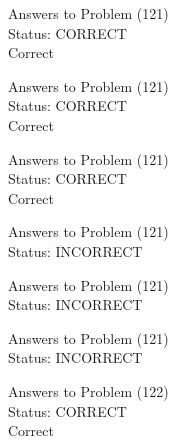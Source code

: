 \documentclass[11pt]{article}
\begin{document}
\begin{minipage}[t]{0.5\textwidth}
  {\centering
  
  Answers to Problem (121)\\
  Status: CORRECT\\
  Correct\\
  }
\end{minipage}
\begin{minipage}[t]{0.5\textwidth}
  {\centering
  
  Answers to Problem (121)\\
  Status: CORRECT\\
  Correct\\
  }
\end{minipage}
\begin{minipage}[t]{0.5\textwidth}
  {\centering
  
  Answers to Problem (121)\\
  Status: CORRECT\\
  Correct\\
  }
\end{minipage}
\begin{minipage}[t]{0.5\textwidth}
  {\centering
  
  Answers to Problem (121)\\
  Status: INCORRECT\\
  
  }
\end{minipage}
\begin{minipage}[t]{0.5\textwidth}
  {\centering
  
  Answers to Problem (121)\\
  Status: INCORRECT\\
  
  }
\end{minipage}
\begin{minipage}[t]{0.5\textwidth}
  {\centering
  
  Answers to Problem (121)\\
  Status: INCORRECT\\
  
  }
\end{minipage}
\begin{minipage}[t]{0.5\textwidth}
  {\centering
  
  Answers to Problem (122)\\
  Status: CORRECT\\
  Correct\\
  }
\end{minipage}
\end{document}
